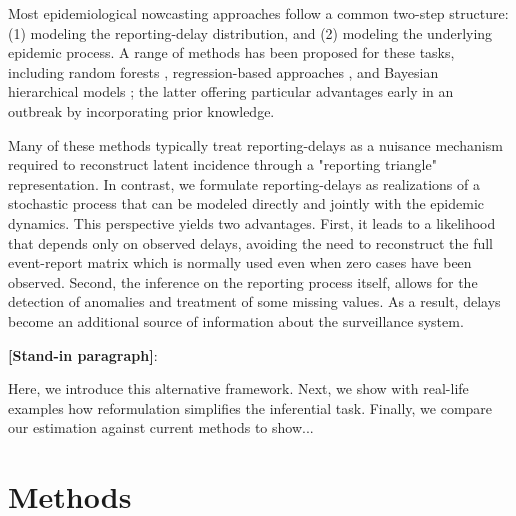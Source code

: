 \documentclass[12pt]{article}
\begin{document}
Most epidemiological nowcasting approaches follow a common two-step structure: (1) modeling the reporting-delay distribution, and (2) modeling the underlying epidemic process. A range of methods has been proposed for these tasks, including random forests \cite{sahai2022machine}, regression-based approaches \cite{donker2011nowcasting, mcgough2020nowcasting, bastos2019modelling}, and Bayesian hierarchical models \cite{johnson2025baseline,gunther2021nowcasting, hohle2014bayesian}; the latter offering particular advantages early in an outbreak by incorporating prior knowledge. 


Many of these methods typically treat reporting-delays as a nuisance mechanism required to reconstruct latent incidence through a "reporting triangle" representation\cite{verrall1989state, mcgough2020nowcasting}. In contrast, we formulate reporting-delays as realizations of a stochastic process that can be modeled directly and jointly with the epidemic dynamics. This perspective yields two advantages. First, it leads to a likelihood that depends only on observed delays, avoiding the need to reconstruct the full event-report matrix which is normally used even when zero cases have been observed. Second, the inference on the reporting process itself, allows for the detection of anomalies and treatment of some missing values. As a result, delays become an additional source of information about the surveillance system.


{\color{red} \textbf{[Stand-in paragraph]}:

Here, we introduce this alternative framework. Next, we show with real-life examples how reformulation simplifies the inferential task. Finally, we compare our estimation against current methods to show...
}

\section{Methods}
\end{document}
